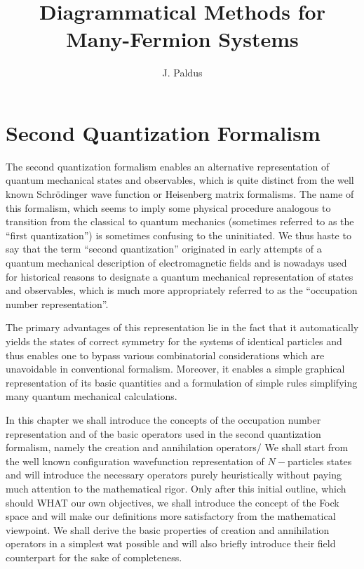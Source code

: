 \documentclass{book}
\newcommand{\WHAT}{{\color{red}WHAT} }
\begin{document}
\title{Diagrammatical Methods for Many-Fermion Systems }\author{J. Paldus}
\maketitle

\chapter{Second Quantization Formalism}
The second quantization formalism enables an alternative representation of quantum mechanical states and observables, which is quite distinct from the well known Schr\"odinger wave function or Heisenberg matrix formalisms. The name of this formalism, which seems to imply some physical procedure analogous to transition from the classical to quantum mechanics (sometimes referred to as the ``first quantization'') is sometimes confusing to the uninitiated. We thus haste to say that the term ``second quantization'' originated in early attempts of a quantum mechanical description of electromagnetic fields and is nowadays used for historical reasons to designate a quantum mechanical representation of states and observables, which is much more appropriately referred to as the ``occupation number representation''.

The primary advantages of this representation lie in the fact that it automatically yields the states of correct symmetry for the systems of identical particles and thus enables one to bypass various combinatorial considerations which are unavoidable in conventional formalism. Moreover, it enables a simple graphical representation of its basic quantities and a formulation of simple rules simplifying many quantum mechanical calculations.

In this chapter we shall introduce the concepts of the occupation number representation and of the basic operators used in the second quantization formalism, namely the creation and annihilation operators/ We shall start from the well known configuration wavefunction representation of $N-$particles states and will introduce the necessary operators purely heuristically without paying much attention to the mathematical rigor. Only after this initial outline, which should \WHAT our own objectives, we shall introduce the concept of the Fock space and will make our definitions more satisfactory from the mathematical viewpoint. We shall derive the basic properties of creation and annihilation operators in a simplest wat possible and will also briefly introduce their field counterpart for the sake of completeness.
\end{document}
